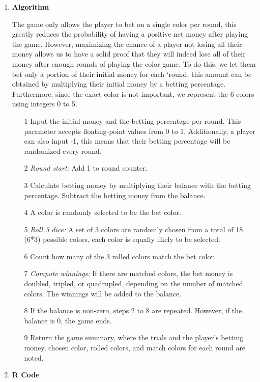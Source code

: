 \documentclass[12pt,letterpaper]{article}
\begin{document}
\begin{enumerate}[label=\Alph*]
\item \textbf{Algorithm}

The game only allows the player to bet on a single color per round, this greatly reduces the probability of having a positive net money after playing the game. However, maximizing the chance of a player not losing all their money allows us to have a solid proof that they will indeed lose all of their money after enough rounds of playing the color game. To do this, we let them bet only a portion of their initial money for each `round; this amount can be obtained by multiplying their initial money by a betting percentage. Furthermore, since the exact color is not important, we represent the 6 colors using integers 0 to 5.

\begin{enumerate}
	\item[1] Input the initial money and the betting percentage per round. This parameter accepts floating-point values from 0 to 1. Additionally, a player can also input -1, this means that their betting percentage will be randomized every round.
	\item[2]\textit{Round start:} Add 1 to round counter. 
	\item[3] Calculate betting money by multiplying their balance with the betting percentage. Subtract the betting money from the balance. 
	\item[4] A color is randomly selected to be the bet color. 
	\item[5] \textit{Roll 3 dice:} A set of 3 colors are randomly chosen from a total of 18 (6*3) possible colors, each color is equally likely to be selected.
	\item[6] Count how many of the 3 rolled colors match the bet color. 
	\item[7] \textit{Compute winnings:} If there are matched colors, the bet money is doubled, tripled, or quadrupled, depending on the number of matched colors. The winnings will be added to the balance.
	\item[8] If the balance is non-zero, steps 2 to 8 are repeated. However, if the balance is 0, the game ends.
	\item[9] Return the game summary, where the trials and the player's betting money, chosen color, rolled colors, and match colors for each round are noted.
\end{enumerate}

\item \textbf{R Code}


\end{enumerate}
\end{document}
